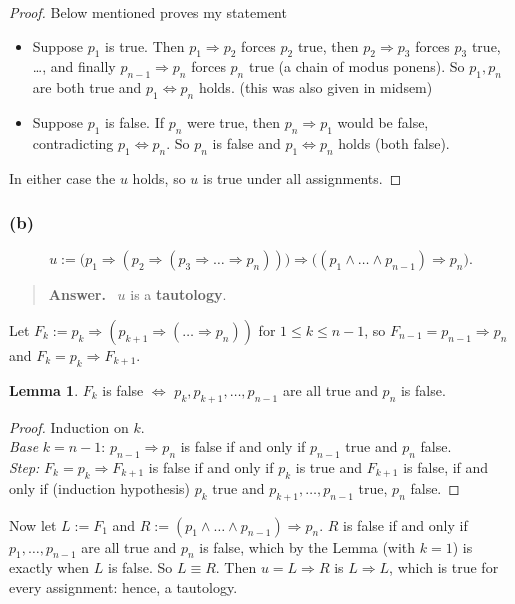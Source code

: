 \documentclass[11pt,a4paper]{article}
\renewcommand{\iff}{\Longleftrightarrow}
\newenvironment{answerbox}[1][Answer]{\par\smallskip\begin{quote}\textbf{#1.}\ }{\end{quote}}
\theoremstyle{definition}
\newtheorem*{lemma*}{Lemma}
\begin{document}
\begin{proof} Below mentioned proves my statement
\begin{itemize}
  \item Suppose $p_1$ is true. Then $p_1\Rightarrow p_2$ forces $p_2$ true, then $p_2\Rightarrow p_3$ forces $p_3$ true, \dots, and finally $p_{n-1}\Rightarrow p_n$ forces $p_n$ true (a chain of modus ponens). So $p_1,p_n$ are both true and $p_1\iff p_n$ holds. (this was also given in midsem)
  \item Suppose $p_1$ is false. If $p_n$ were true, then $p_n\Rightarrow p_1$ would be false, contradicting $p_1\iff p_n$. So $p_n$ is false and $p_1\iff p_n$ holds (both false).
\end{itemize}
In either case the $u$ holds, so $u$ is true under all assignments.
\end{proof}








\subsubsection{(b)}
\[
u:=\big(p_1\Rightarrow(p_2\Rightarrow(p_3\Rightarrow\dots\Rightarrow p_n))\big)\Rightarrow\big((p_1\wedge\dots\wedge p_{n-1})\Rightarrow p_n\big).
\]
\begin{answerbox}[Answer]
$u$ is a \textbf{tautology}.
\end{answerbox}
Let $F_k:=p_k\Rightarrow(p_{k+1}\Rightarrow(\dots\Rightarrow p_n))$ for $1\le k\le n-1$, so $F_{n-1}=p_{n-1}\Rightarrow p_n$ and $F_k=p_k\Rightarrow F_{k+1}$.

\begin{lemma*}
$F_k$ is false $\iff$ $p_k,p_{k+1},\dots,p_{n-1}$ are all true and $p_n$ is false.
\end{lemma*}
\begin{proof}
Induction on $k$.\\ \emph{Base} $k=n-1$: $p_{n-1}\Rightarrow p_n$ is false if and only if $p_{n-1}$ true and $p_n$ false.\\ \emph{Step:} $F_k=p_k\Rightarrow F_{k+1}$ is false if and only if $p_k$ is true and $F_{k+1}$ is false, if and only if (induction hypothesis) $p_k$ true and $p_{k+1},\dots,p_{n-1}$ true, $p_n$ false.
\end{proof}
Now let $L:=F_1$ and $R:=(p_1\wedge\dots\wedge p_{n-1})\Rightarrow p_n$. $R$ is false if and only if $p_1,\dots,p_{n-1}$ are all true and $p_n$ is false, which by the Lemma (with $k=1$) is exactly when $L$ is false. So $L\equiv R$. Then $u=L\Rightarrow R$ is $L\Rightarrow L$, which is true for every assignment: hence, a tautology. 
\end{document}
